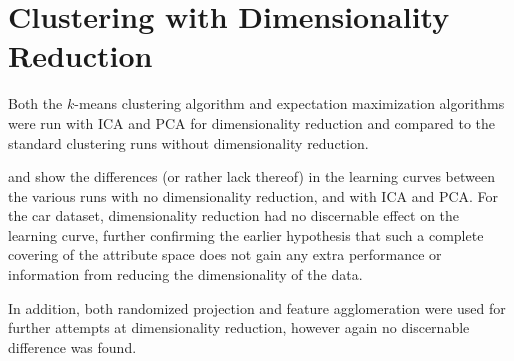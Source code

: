 \documentclass{article}
\begin{document}
  \section{Clustering with Dimensionality Reduction}
    Both the $k$-means clustering algorithm and expectation maximization algorithms were run with ICA and PCA for dimensionality reduction and compared to the standard clustering runs without dimensionality reduction.

     and  show the differences (or rather lack thereof) in the learning curves between the various runs with no dimensionality reduction, and with ICA and PCA. For the car dataset, dimensionality reduction had no discernable effect on the learning curve, further confirming the earlier hypothesis that such a complete covering of the attribute space does not gain any extra performance or information from reducing the dimensionality of the data.

    In addition, both randomized projection and feature agglomeration were used for further attempts at dimensionality reduction, however again no discernable difference was found.
\end{document}
